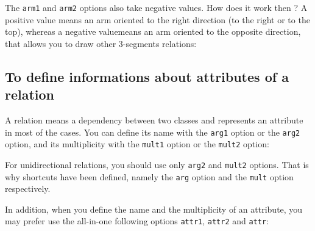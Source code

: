 \documentclass[a4paper,11pt]{report}
\begin{document}
\medskip

The {\tt arm1} and {\tt arm2} options also take negative values. How does it work then ? 
A positive value means an arm oriented to the right direction (to the right or to the top), whereas a negative valuemeans an arm oriented to the opposite direction, that allows you to draw other 3-segments relations:

\medskip

\begin{minipage}{0.5\textwidth}

\end{minipage}
\begin{minipage}{0.4\textwidth}
\begin{center}
\end{center}
\end{minipage}


\subsection{To define informations about attributes of a relation}\label{ss.relattr}

A relation means a dependency between two classes and represents an attribute in most of the cases. You can define its name with the {\tt arg1} option or the {\tt arg2} option, and its multiplicity with the {\tt mult1} option or the {\tt mult2} option:

\medskip

\begin{minipage}{0.5\textwidth}

\end{minipage}
\begin{minipage}{0.4\textwidth}
\begin{center}
\end{center}
\end{minipage}

\medskip

For unidirectional relations, you should use only {\tt arg2} and {\tt mult2} options. That is why shortcuts have been defined, namely the {\tt arg} option and the {\tt mult} option respectively.

In addition, when you define the name and the multiplicity of an attribute, you may prefer use the all-in-one following options {\tt attr1}, {\tt attr2} and {\tt attr}:

\medskip

\begin{minipage}{0.5\textwidth}

\end{minipage}
\begin{minipage}{0.4\textwidth}
\begin{center}
\end{center}
\end{minipage}
\end{document}
